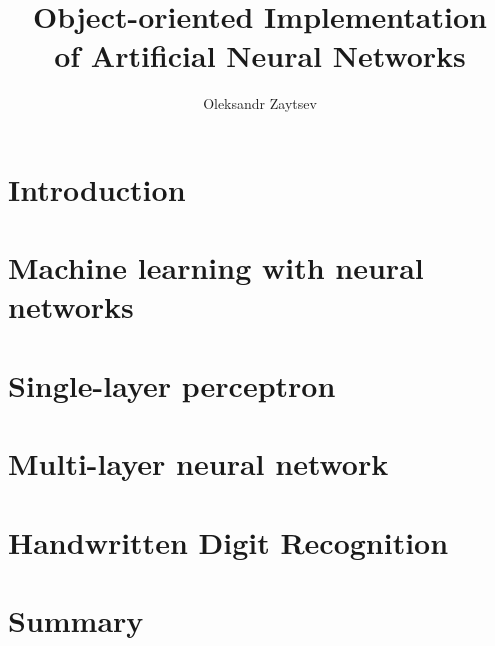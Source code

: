 \documentclass[a4paper, 12pt, oneside]{book}
\title{Object-oriented Implementation \\
       of Artificial Neural Networks}
\author{Oleksandr Zaytsev}
\begin{document}
  \tableofcontents
  
  \chapter{Introduction}
  
  
  \chapter{Machine learning with neural networks}
  
  
  \chapter{Single-layer perceptron}
  
  
  \chapter{Multi-layer neural network}
  
  
  \chapter{Handwritten Digit Recognition}
  
  
  \chapter*{Summary}
  
  
  \nocite{Hassoun-1995}
  \nocite{Bishop-2006}
  \nocite{Rumelhart-et-al-1986}
  \nocite{PBE1}
  \nocite{PharoNum}
  \nocite{Bergel}
  \nocite{BlueBook}
  
%   
  
  
  \begin{otherlanguage}{ukrainian}
    \renewcommand\bibname{Bibliography}
    
  \end{otherlanguage}
\end{document}
